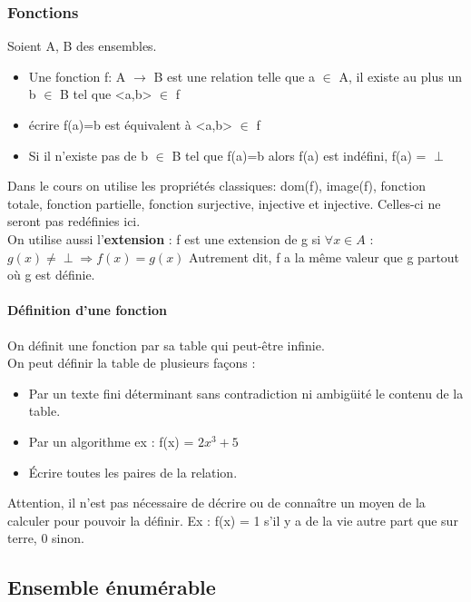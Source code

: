 \documentclass[11pt,a4paper]{article}
\theoremstyle{definition}
\begin{document}

\subsubsection{Fonctions}
\label{ssub:fonctions}
Soient A, B des ensembles.
\begin{itemize}
	\item Une fonction f: A $\rightarrow$ B est une relation telle que a $\in$
	A, il existe au plus un b $\in$ B tel que <a,b> $\in$ f
	\item écrire f(a)=b est équivalent à <a,b> $\in$ f
	\item Si il n'existe pas de b $\in$ B tel que f(a)=b alors f(a) est indéfini,
		f(a) = $\perp$
\end{itemize}

Dans le cours on utilise les propriétés classiques: dom(f), image(f), fonction totale,
fonction partielle, fonction surjective, injective et injective. Celles-ci ne 
seront pas redéfinies ici.\\
On utilise aussi l'\textbf{extension} : 
f est une extension de g si $\forall x \in A$ : $g(x)\neq \perp \Rightarrow f(x) = g(x)$
Autrement dit, f a la même valeur que g partout où g est définie.

\paragraph{Définition d'une fonction}
\label{par:d_finition_d_une_fonciton}
On définit une fonction par sa table qui peut-être infinie.\\
On peut définir la table de plusieurs façons :
\begin{itemize}
	\item Par un texte fini déterminant sans contradiction ni ambigüité le contenu
		de la table.
	\item Par un algorithme ex : f(x) = $2x^3+5$
	\item Écrire toutes les paires de la relation.
\end{itemize}
Attention, il n'est pas nécessaire de décrire ou de connaître un moyen de la calculer
pour pouvoir la définir. Ex : f(x) = 1 s'il y a de la vie autre part que sur terre,
0 sinon.

\subsection{Ensemble énumérable}
\label{sub:ensemble_num_rables}
\end{document}
